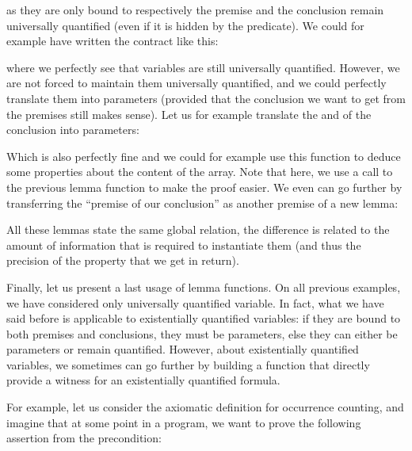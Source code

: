 


as they are only bound to respectively the premise and the conclusion remain
universally quantified (even if it is hidden by the predicate). We could for
example have written the contract like this:






where we perfectly see that variables are still universally quantified. However,
we are not forced to maintain them universally quantified, and we could
perfectly translate them into parameters (provided that the conclusion we want
to get from the premises still makes sense). Let us for example translate the
 and  of the conclusion into parameters:






Which is also perfectly fine and we could for example use this function to
deduce some properties about the content of the array. Note that here, we use a
call to the previous lemma function to make the proof easier. We even can go
further by transferring the ``premise of our conclusion'' as another premise of
a new lemma:






All these lemmas state the same global relation, the difference is related to
the amount of information that is required to instantiate them (and thus the
precision of the property that we get in return).



Finally, let us present a last usage of lemma functions. On all previous
examples, we have considered only universally quantified variable. In fact, what
we have said before is applicable to existentially quantified variables: if they
are bound to both premises and conclusions, they must be parameters, else they
can either be parameters or remain quantified. However, about existentially
quantified variables, we sometimes can go further by building a function that
directly provide a witness for an existentially quantified formula.



For example, let us consider the axiomatic definition for occurrence counting,
and imagine that at some point in a program, we want to prove the following
assertion from the precondition:



